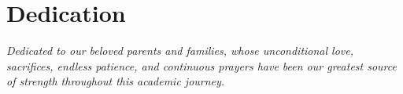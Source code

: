\section*{Dedication}

\vspace*{3cm}
\begin{center}
\textit{Dedicated to our beloved parents and families, whose unconditional love, sacrifices, endless patience, and continuous prayers have been our greatest source of strength throughout this academic journey.}
\end{center}

\clearpage


